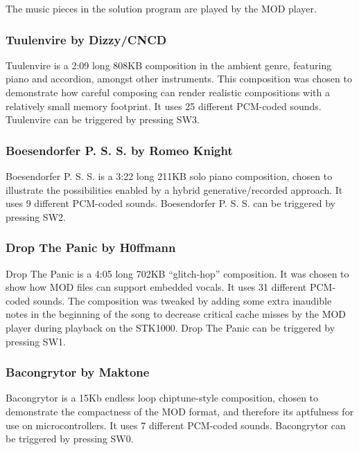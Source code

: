 The music pieces in the solution program are played by the MOD player.

\subsubsection{Tuulenvire by Dizzy/CNCD}
Tuulenvire is a 2:09 long 808KB composition in the ambient genre, featuring piano and accordion, amongst other instruments.
This composition was chosen to demonstrate how careful composing can render realistic compositions with a relatively small memory footprint.
It uses 25 different PCM-coded sounds.
Tuulenvire can be triggered by pressing SW3.

\subsubsection{Boesendorfer P. S. S. by Romeo Knight}
Boesendorfer P. S. S. is a 3:22 long 211KB solo piano composition, chosen to illustrate the possibilities enabled by a hybrid generative/recorded approach.
It uses 9 different PCM-coded sounds.
Boesendorfer P. S. S. can be triggered by pressing SW2.

\subsubsection{Drop The Panic by H0ffmann}
Drop The Panic is a 4:05 long 702KB ``glitch-hop'' composition.
It was chosen to show how MOD files can support embedded vocals.
It uses 31 different PCM-coded sounds.
The composition was tweaked by adding some extra inaudible notes in the beginning of the song to decrease critical cache misses by the MOD player during playback on the STK1000.
Drop The Panic can be triggered by pressing SW1.

\subsubsection{Bacongrytor by Maktone}
Bacongrytor is a 15Kb endless loop chiptune-style composition, chosen to demonstrate the compactness of the MOD format, and therefore its aptfulness for use on microcontrollers.
It uses 7 different PCM-coded sounds.
Bacongrytor can be triggered by pressing SW0.
